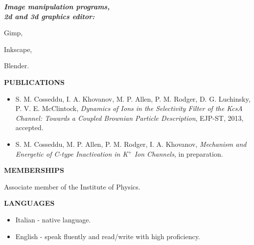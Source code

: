 \documentclass[a4paper,10pt,final]{memoir}
\newcommand{\Sep}{\vspace{1.5em}}
\newcommand{\SmallSep}{\vspace{0.5em}}
\newcommand{\CVSection}[1]
	{\Large\textbf{#1}\par
	\SmallSep\normalsize\normalfont}
\newcommand{\CVItem}[2]
	{\textit{\textbf{\color{RoyalBlue} #1}} #2}
\begin{document}
\begin{multicols}{3}
\CVItem{Image manipulation programs,\\2d and 3d graphics editor:\hfill}
\begin{compactitem}[\color{RoyalBlue}$\circ$]
\item Gimp,
\item Inkscape,
\item Blender.
\end{compactitem}

\end{multicols}




\Sep
\CVSection{PUBLICATIONS} 
\begin{itemize} \itemsep -2pt %
\item S. M. Cosseddu, I. A. Khovanov, M. P. Allen, P. M. Rodger, D. G. Luchinsky,
  P. V. E. McClintock, \textit{Dynamics of Ions in the Selectivity Filter of the KcsA Channel: Towards a Coupled
  Brownian Particle Description}, EJP-ST, 2013, accepted.
\item S. M. Cosseddu, M. P. Allen, P. M. Rodger, I. A. Khovanov, \textit{Mechanism and Energetic
  of C-type Inactivation in K$^+$ Ion Channels}, in preparation.
\end{itemize}


\Sep
\CVSection{MEMBERSHIPS} 
Associate member of the Institute of Physics. 

\Sep
\CVSection{LANGUAGES} 
\begin{itemize} \itemsep -2pt %
\item Italian - native language.
\item English - speak fluently and read/write with high proficiency.
\end{itemize}
\end{document}
